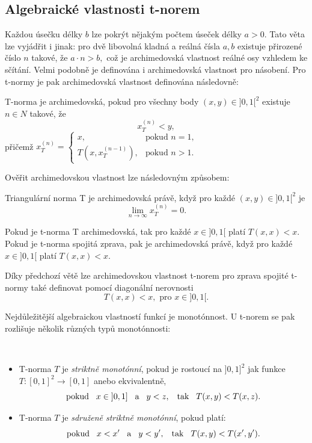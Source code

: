 \subsection{Algebraick\'e vlastnosti t-norem}

Každou \' usečku délky $b$ lze pokrýt nějakým počtem \' useček délky $a > 0.$ Tato věta lze vyjádřit i jinak: pro dvě libovolná kladná a reálná čísla $a,b$ existuje přirozené číslo $n$ takové, že $a\cdot n>b,$ což je archimedovská vlastnost reálné osy vzhledem ke sčítání. Velmi podobně je definována i archimedovská vlastnost pro násobení. Pro t-normy je pak archimedovská vlastnost definována následovně:
\begin{definition}
\cite{KMP}
    T-norma je archimedovská, pokud pro všechny body $(x,y) \in ]0,1[^2$ existuje $n \in N$ takové, že $$x_T^{(n)} < y,$$
    p\v ri\v cem\v z $x^{(n)}_T=\begin{cases} x, &\mbox {pokud $n=1,$} \\ {T(x,x_T^{(n-1)})},
&\mbox {pokud $n>1.$}\end{cases}$

\end{definition}
Ověřit archimedovskou vlastnost lze následovným zp\r usobem:
\begin{sentence} \cite{KMP}
    Triangulární norma T je archimedovská právě, když pro každé $(x,y) \in ]0,1[^2$ je $$\lim_{n \to \infty}x_T^{(n)} = 0.$$
\end{sentence}
\begin{sentence} \cite{KMP}
    Pokud je t-norma T archimedovská, tak pro každé $x \in ]0,1[$ platí $T(x,x) < x.$\\
    Pokud je t-norma spojitá zprava, pak je archimedovská právě, když pro každé $x \in ]0,1[$ platí $T(x,x) < x.$
\end{sentence}

    Díky p\v redchozí v\v et\v e lze  archimedovskou vlastnost t-norem pro zprava spojit\'e t-normy také definovat pomocí diagonální nerovnosti $$T(x,x) < x, \mbox{ pro } x \in ]0,1[.$$

    Nejd\r uležitější algebraickou vlastností funkcí je monot\' onnost. U t-norem se pak rozlišuje několik r\r uzných typ\r u monot\' onnosti:
    \begin{definition}
    \cite{KMP}\\
        \begin{itemize}
            \item T-norma $T$ je {\em striktně
            monot\' onní}, pokud
            je rostoucí na $]0,1]^2$ jak funkce $ T:[0,1]^2 \rightarrow [0,1]$ anebo
            ekvivalentně,
            $$ \text {pokud} \hskip 3mm x \in \hskip 1mm ]0,1] \hskip 3mm \text{a} \hskip 3mm y < z, \hskip 3mm \text {tak} \hskip 3mm T(x,y) < T(x,z). $$
            \item  T-norma $T$ je {\em sdruženě striktně
            monot\' onní}, pokud platí:
            $$ \text{pokud} \hskip 3mm  x < x'\hskip 3mm \text{a} \hskip 3mm y<y',
            \hskip 3mm  \text{tak} \hskip 3mm   T(x,y)<T(x',y').$$
            \end{itemize}
    \end{definition}


